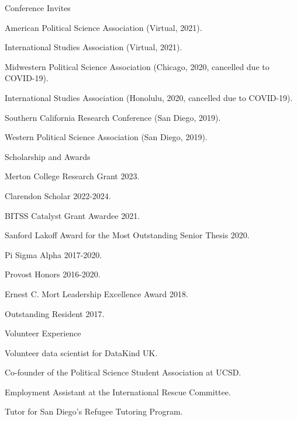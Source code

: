 \documentclass[10pt]{resume} %
\begin{document}
	\begin{rSection}{Conference Invites}
		\itemsep -5pt
		\item American Political Science Association (Virtual, 2021).
		\item International Studies Association (Virtual, 2021).
		\item Midwestern Political Science Association (Chicago, 2020, cancelled due to COVID-19).
		\item International Studies Association (Honolulu, 2020, cancelled due to COVID-19).
		\item Southern California Research Conference (San Diego, 2019).
		\item Western Political Science Association (San Diego, 2019).
	\end{rSection}
	
	\begin{rSection}{Scholarship and Awards}
		\itemsep -5pt
		\item Merton College Research Grant 2023.
		\item Clarendon Scholar 2022-2024.
		\item BITSS Catalyst Grant Awardee 2021.
		\item Sanford Lakoff Award for the Most Outstanding Senior Thesis 2020.
		\item Pi Sigma Alpha 2017-2020. 
		\item Provost Honors 2016-2020. 
		\item Ernest C. Mort Leadership Excellence Award 2018. 
		\item Outstanding Resident 2017.
	\end{rSection}
	
	\begin{rSection}{Volunteer Experience} \itemsep -5pt
		\item Volunteer data scientist for DataKind UK.
		\item Co-founder of the Political Science Student Association at UCSD.
		\item Employment Assistant at the International Rescue Committee.
		\item Tutor for San Diego's Refugee Tutoring Program.
	\end{rSection}
\end{document}
